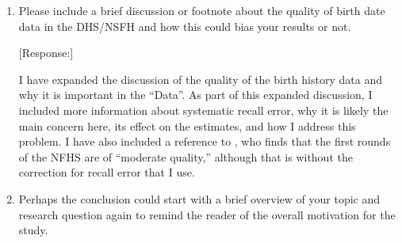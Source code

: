 \documentclass[letterpaper,12pt]{article}
\begin{document}
\begin{enumerate}
[Response:]

I now define spell as the unit of analysis---the period from one parity birth to 
the following birth or censoring---when I first use the word in the ``Estimation 
Strategy'' section.
Furthermore, I clarify that for estimation purposes, spells begin nine months 
after the previous birth since this is the earliest we should expect to observe 
a new birth.

To make comparisons with both the NFHS reports and the prior literature on
birth spacing easier and avoid confusion, I have rewritten the discussions of 
spacing and redone the graphs and table, so all results now reflect birth 
intervals in months.
I still retain the use of ``spell'' to indicate a generic period from one parity 
birth to another---i.e.,the second spell is from first birth to the second birth or
censoring---in the graphs/tables.


In the Data section, I have also changed the discussion of the imposed censoring 
clearer by specifying the cut-offs for both the spell duration and the birth interval.
In the ``Estimation Strategy'' section, I explain that I add nine months
to the estimated spell length to get to birth intervals.
In the ``Mortality and the Changing Birth Spacing'' section, I retained the
definition of the periods but updated the numbers and the discussion of
results. 
Hence, they now reflect birth intervals rather than pregnancy intervals.



\item Please include a brief discussion or footnote about the quality of
birth date data in the DHS/NSFH and how this could bias your results or
not.

[Response:]

I have expanded the discussion of the quality of the birth history data and why it is
important in the ``Data''. 
As part of this expanded discussion, I included more information about systematic recall 
error, why it is likely the main concern here, its effect on the estimates, and how I 
address this problem.
I have also included a reference to \citet{Schoumaker2014}, who finds that the first
rounds of the NFHS are of ``moderate quality,'' although that is without the correction
for recall error that I use.


\item Perhaps the conclusion could start with a brief overview of your
topic and research question again to remind the reader of the overall
motivation for the study.


\end{enumerate}
\end{document}

